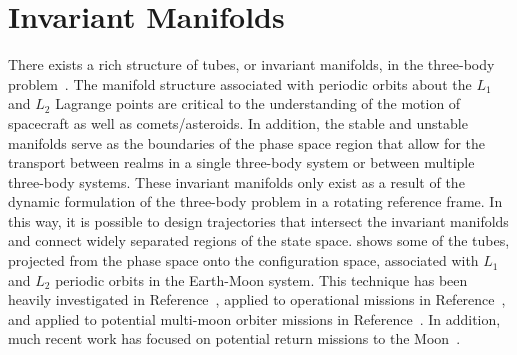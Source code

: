 \section{Invariant Manifolds} \label{sec:invariant_manifold}
There exists a rich structure of tubes, or invariant manifolds, in the three-body problem~\cite{koon2000,conley1968}.
The manifold structure associated with periodic orbits about the \( L_1 \) and \( L_2 \) Lagrange points are critical to the understanding of the motion of spacecraft as well as comets/asteroids.
In addition, the stable and unstable manifolds serve as the boundaries of the phase space region that allow for the transport between realms in a single three-body system or between multiple three-body systems.
These invariant manifolds only exist as a result of the dynamic formulation of the three-body problem in a rotating reference frame. 
In this way, it is possible to design trajectories that intersect the invariant manifolds and connect widely separated regions of the state space. 
 shows some of the tubes, projected from the phase space onto the configuration space, associated with \( L_1 \) and \( L_2 \) periodic orbits in the Earth-Moon system. 
This technique has been heavily investigated in Reference~\cite{koon2000}, applied to operational missions in Reference~\cite{koon1999}, and applied to potential multi-moon orbiter missions in Reference~\cite{tanaka2011}.
In addition, much recent work has focused on potential return missions to the Moon~\cite{zanzottera2012,campagnola2012,mingotti2011,ozimek2010a,mingotti2009}.
